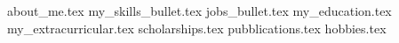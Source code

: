 \documentclass[11pt, a4paper]{awesome-cv}
\newcommand*{\sectiondir}{cv/}
\begin{document}
\makecvheader[R]

{about_me.tex}
{my_skills_bullet.tex}
{jobs_bullet.tex}
{my_education.tex}
{my_extracurricular.tex}
{scholarships.tex}
{pubblications.tex}
{hobbies.tex}
\end{document}
